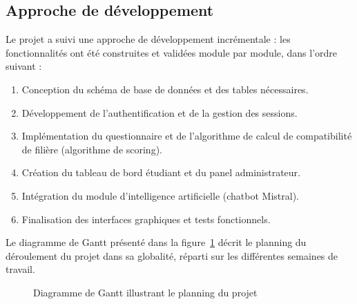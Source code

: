 \documentclass[a4paper,12pt]{article}
\begin{document}
\subsection{Approche de développement}

Le projet a suivi une approche de développement incrémentale : les fonctionnalités ont été construites et validées module par module, dans l’ordre suivant :
\begin{enumerate}
    \item Conception du schéma de base de données et des tables nécessaires.
    \item Développement de l’authentification et de la gestion des sessions.
    \item Implémentation du questionnaire et de l’algorithme de calcul de compatibilité de filière (algorithme de scoring).
    \item Création du tableau de bord étudiant et du panel administrateur.
    \item Intégration du module d’intelligence artificielle (chatbot Mistral).
    \item Finalisation des interfaces graphiques et tests fonctionnels.
\end{enumerate}

Le diagramme de Gantt présenté dans la figure~\ref{fig:gantt} décrit le planning du déroulement du projet dans sa globalité, réparti sur les différentes semaines de travail.

\begin{figure}[H]
\centering
{}
\caption{Diagramme de Gantt illustrant le planning du projet}
\label{fig:gantt}
\end{figure}
\end{document}
